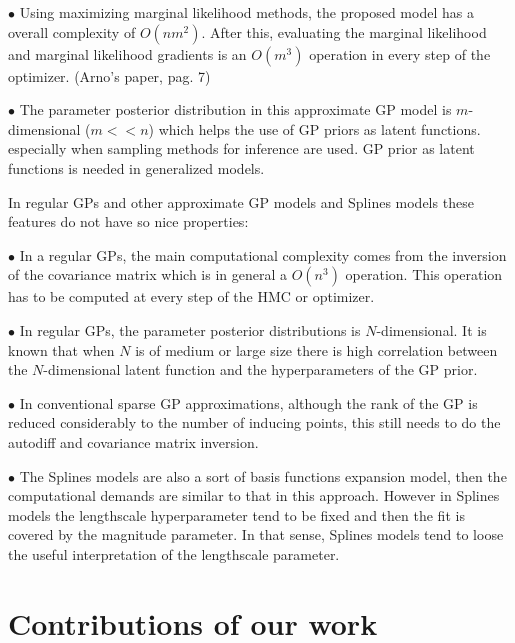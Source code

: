 \documentclass[]{interact}
\theoremstyle{plain}%
\theoremstyle{definition}
\theoremstyle{remark}
\begin{document}
\vspace{2mm}
$\bullet$ Using maximizing marginal likelihood methods, the proposed model has a overall complexity of $O(nm^2)$. After this, evaluating the marginal likelihood and marginal likelihood gradients is an $O(m^3)$ operation in every step of the optimizer. (Arno's paper, pag. 7)

\vspace{2mm}
$\bullet$ The parameter posterior distribution in this approximate GP model is $m$-dimensional ($m<<n$) which helps the use of GP priors as latent functions. especially when sampling methods for inference are used. GP prior as latent functions is needed in generalized models.

In regular GPs and other approximate GP models and Splines models these features do not have so nice properties:

\vspace{2mm}
$\bullet$ In a regular GPs, the main computational complexity comes from the inversion of the covariance matrix which is in general a $O(n^3)$ operation. This operation has to be computed at every step of the HMC or optimizer.

\vspace{2mm}
$\bullet$ In regular GPs, the parameter posterior distributions is $N$-dimensional. It is known that when $N$ is of medium or large size there is high correlation between the $N$-dimensional latent function and the hyperparameters of the GP prior.

\vspace{2mm}
$\bullet$ In conventional sparse GP approximations, although the rank of the GP is reduced considerably to the number of inducing points, this still needs to do the autodiff and covariance matrix inversion.

\vspace{2mm}
$\bullet$ The Splines models are also a sort of basis functions expansion model, then the computational demands are similar to that in this approach. However in Splines models the lengthscale hyperparameter tend to be fixed and then the fit is covered by the magnitude parameter. In that sense, Splines models tend to loose the useful interpretation of the lengthscale parameter.



\section{Contributions of our work}
\end{document}
